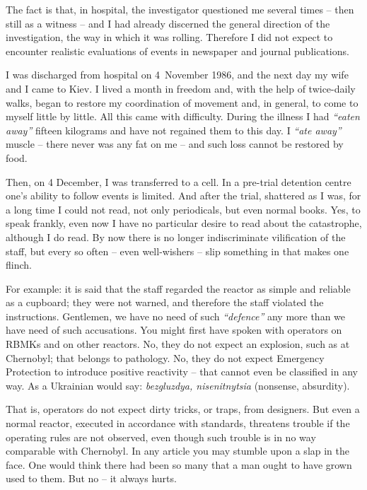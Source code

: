 \documentclass[openright]{bookest}
\begin{document}
The fact is that, in hospital, the investigator questioned me several times -- then still as a witness -- and I had already discerned the general direction of the investigation, the way in which it was rolling. Therefore I did not expect to encounter realistic evaluations of events in newspaper and journal publications.

I was discharged from hospital on 4~November 1986, and the next day my wife and I came to Kiev. I lived a month in freedom and, with the help of twice-daily walks, began to restore my coordination of movement and, in general, to come to myself little by little. All this came with difficulty. During the illness I had \textit{``eaten away''} fifteen kilograms and have not regained them to this day. I \textit{``ate away''} muscle -- there never was any fat on me -- and such loss cannot be restored by food.

Then, on 4 December, I was transferred to a cell. In a pre-trial detention centre one's ability to follow events is limited. And after the trial, shattered as I was, for a long time I could not read, not only periodicals, but even normal books. Yes, to speak frankly, even now I have no particular desire to read about the catastrophe, although I do read. By now there is no longer indiscriminate vilification of the staff, but every so often -- even well-wishers -- slip something in that makes one flinch.

For example: it is said that the staff regarded the reactor as simple and reliable as a cupboard; they were not warned, and therefore the staff violated the instructions. Gentlemen, we have no need of such \textit{``defence''} any more than we have need of such accusations. You might first have spoken with operators on RBMKs and on other reactors. No, they do not expect an explosion, such as at Chernobyl; that belongs to pathology. No, they do not expect Emergency Protection to introduce positive reactivity -- that cannot even be classified in any way. As a Ukrainian would say: \textit{bezgluzdya, nisenitnytsia} (nonsense, absurdity).

That is, operators do not expect dirty tricks, or traps, from designers. But even a normal reactor, executed in accordance with standards, threatens trouble if the operating rules are not observed, even though such trouble is in no way comparable with Chernobyl. In any article you may stumble upon a slap in the face. One would think there had been so many that a man ought to have grown used to them. But no -- it always hurts.
\end{document}
